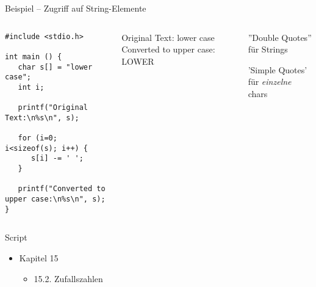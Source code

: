 
\begin{frame}[fragile]{Beispiel -- Zugriff auf String-Elemente}
%
\begin{columns}[T]
\begin{codebox}
\begin{verbatim}
#include <stdio.h>

int main () {
   char s[] = "lower case";
   int i;

   printf("Original Text:\n%s\n", s);
   
   for (i=0; i<sizeof(s); i++) {
      s[i] -= ' ';
   }

   printf("Converted to upper case:\n%s\n", s);
}
\end{verbatim}
\end{codebox}
%
\begin{cmdbox}[Ausgabe]
\ttfamily \footnotesize
Original Text:\newline
lower case\newline
Converted to upper case:\newline
LOWER
\end{cmdbox}
%
\begin{warnbox}
''Double Quotes'' für Strings

'Simple Quotes' für \emph{einzelne} chars
\end{warnbox}
\end{columns}
%
\end{frame}


\begin{frame}{Script}
%
\begin{itemize}
\item Kapitel 15
	\begin{itemize}
	\item 15.2. Zufallszahlen
	\end{itemize}
\end{itemize}
%
\end{frame}


